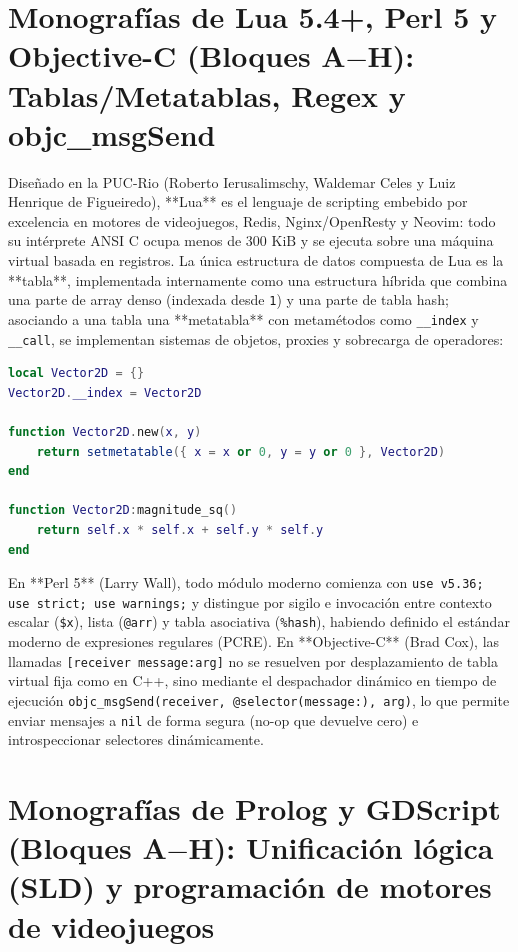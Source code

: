 \documentclass{book}
\begin{document}
\section{Monografías de Lua 5.4+, Perl 5 y Objective-C (Bloques A\(-\)H): Tablas/Metatablas, Regex y objc\_msgSend}

Diseñado en la PUC-Rio (Roberto Ierusalimschy, Waldemar Celes y Luiz Henrique de Figueiredo), **Lua** es el lenguaje de scripting embebido por excelencia en motores de videojuegos, Redis, Nginx/OpenResty y Neovim: todo su intérprete ANSI C ocupa menos de \(300\text{ KiB}\) y se ejecuta sobre una máquina virtual basada en registros. La única estructura de datos compuesta de Lua es la **tabla**, implementada internamente como una estructura híbrida que combina una parte de array denso (indexada desde \texttt{1}) y una parte de tabla hash; asociando a una tabla una **metatabla** con metamétodos como \texttt{\_\_index} y \texttt{\_\_call}, se implementan sistemas de objetos, proxies y sobrecarga de operadores:
\begin{lstlisting}[style=studium,language={Lua}]
local Vector2D = {}
Vector2D.__index = Vector2D

function Vector2D.new(x, y)
    return setmetatable({ x = x or 0, y = y or 0 }, Vector2D)
end

function Vector2D:magnitude_sq()
    return self.x * self.x + self.y * self.y
end
\end{lstlisting}
En **Perl 5** (Larry Wall), todo módulo moderno comienza con \texttt{use v5.36; use strict; use warnings;} y distingue por sigilo e invocación entre contexto escalar (\texttt{\$x}), lista (\texttt{@arr}) y tabla asociativa (\texttt{\%hash}), habiendo definido el estándar moderno de expresiones regulares (PCRE). En **Objective-C** (Brad Cox), las llamadas \texttt{[receiver message:arg]} no se resuelven por desplazamiento de tabla virtual fija como en C++, sino mediante el despachador dinámico en tiempo de ejecución \texttt{objc\_msgSend(receiver, @selector(message:), arg)}, lo que permite enviar mensajes a \texttt{nil} de forma segura (no-op que devuelve cero) e introspeccionar selectores dinámicamente.

\section{Monografías de Prolog y GDScript (Bloques A\(-\)H): Unificación lógica (SLD) y programación de motores de videojuegos}
\end{document}
